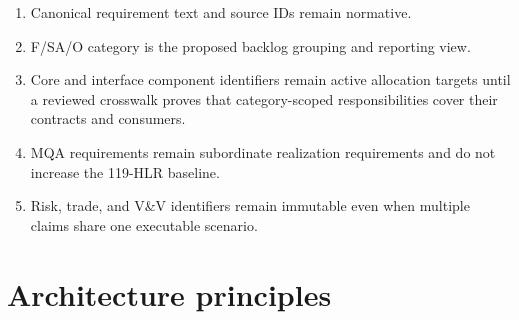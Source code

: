 \documentclass[11pt,letterpaper]{article}
\begin{document}
\begin{enumerate}
\item Canonical requirement text and source IDs remain normative.
\item F/SA/O category is the proposed backlog grouping and reporting view.
\item Core and interface component identifiers remain active allocation targets until a reviewed crosswalk proves that category-scoped responsibilities cover their contracts and consumers.
\item MQA requirements remain subordinate realization requirements and do not increase the 119-HLR baseline.
\item Risk, trade, and V\&V identifiers remain immutable even when multiple claims share one executable scenario.
\end{enumerate}

\section{Architecture principles}
\end{document}
